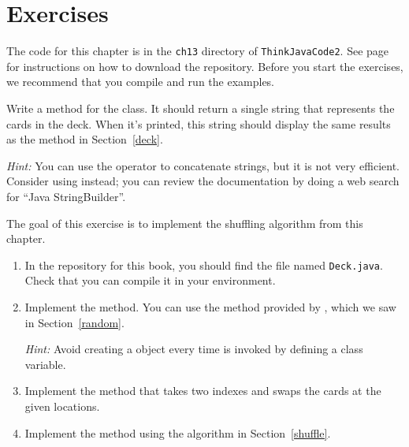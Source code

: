 \section{Exercises}

The code for this chapter is in the {\tt ch13} directory of {\tt ThinkJavaCode2}.
See page~\pageref{code} for instructions on how to download the repository.
Before you start the exercises, we recommend that you compile and run the examples.


\begin{exercise}  %

Write a  method for the  class.
It should return a single string that represents the cards in the deck.
When it's printed, this string should display the same results as the  method in Section~\ref{deck}.


{\it Hint:} You can use the \java{+} operator to concatenate strings, but it is not very efficient.
Consider using  instead; you can review the documentation by doing a web search for ``Java StringBuilder''.

\end{exercise}


\begin{exercise}  %
\label{ex.shuffle}

The goal of this exercise is to implement the shuffling algorithm from this chapter.

\begin{enumerate}

\item In the repository for this book, you should find the file named {\tt Deck.java}.
Check that you can compile it in your environment.

\item Implement the  method.
You can use the  method provided by , which we saw in Section~\ref{random}.

{\it Hint:} Avoid creating a  object every time  is invoked by defining a class variable.

\item Implement the  method that takes two indexes and swaps the cards at the given locations.

\item Implement the  method using the algorithm in Section~\ref{shuffle}.

\end{enumerate}

\end{exercise}



